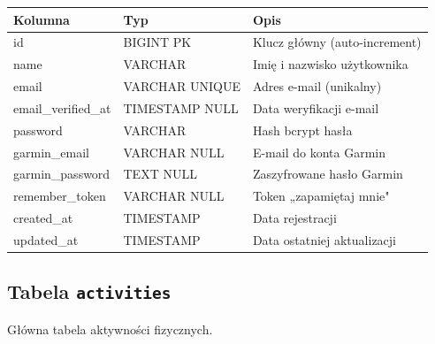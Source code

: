 \documentclass[12pt,a4paper]{report}
\begin{document}
\begin{center}
\begin{tabularx}{\textwidth}{|l|l|X|}
\hline
\textbf{Kolumna}        & \textbf{Typ}              & \textbf{Opis}                        \\
\hline
id                      & BIGINT PK                 & Klucz główny (auto-increment)        \\
name                    & VARCHAR                   & Imię i nazwisko użytkownika          \\
email                   & VARCHAR UNIQUE            & Adres e-mail (unikalny)              \\
email\_verified\_at     & TIMESTAMP NULL            & Data weryfikacji e-mail              \\
password                & VARCHAR                   & Hash bcrypt hasła                    \\
garmin\_email           & VARCHAR NULL              & E-mail do konta Garmin               \\
garmin\_password        & TEXT NULL                 & Zaszyfrowane hasło Garmin            \\
remember\_token         & VARCHAR NULL              & Token „zapamiętaj mnie"              \\
created\_at             & TIMESTAMP                 & Data rejestracji                     \\
updated\_at             & TIMESTAMP                 & Data ostatniej aktualizacji          \\
\hline
\end{tabularx}
\end{center}

\subsection{Tabela \texttt{activities}}

Główna tabela aktywności fizycznych.
\end{document}
